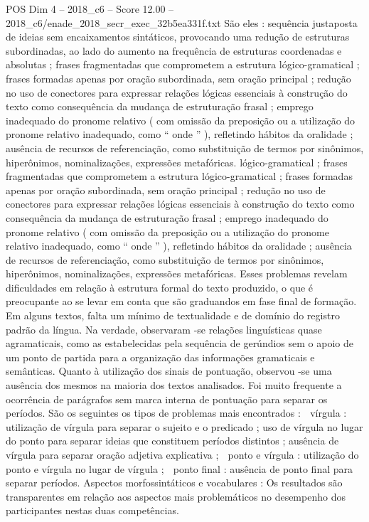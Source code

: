\begin{textsample}{POS Dim 4 – 2018\_c6 – Score 12.00 – 2018\_c6/enade\_2018\_secr\_exec\_32b5ea331f.txt}
São eles : sequência justaposta de ideias sem encaixamentos sintáticos, provocando uma redução de estruturas subordinadas, ao lado do aumento na frequência de estruturas coordenadas e absolutas ; frases fragmentadas que comprometem a estrutura lógico-gramatical ; frases formadas apenas por oração subordinada, sem oração principal ; redução no uso de conectores para expressar relações lógicas essenciais à construção do texto como consequência da mudança de estruturação frasal ; emprego inadequado do pronome relativo ( com omissão da preposição ou a utilização do pronome relativo inadequado, como “ onde ” ), refletindo hábitos da oralidade ; ausência de recursos de referenciação, como substituição de termos por sinônimos, hiperônimos, nominalizações, expressões metafóricas. lógico-gramatical ; frases fragmentadas que comprometem a estrutura lógico-gramatical ; frases formadas apenas por oração subordinada, sem oração principal ; redução no uso de conectores para expressar relações lógicas essenciais à construção do texto como consequência da mudança de estruturação frasal ; emprego inadequado do pronome relativo ( com omissão da preposição ou a utilização do pronome relativo inadequado, como “ onde ” ), refletindo hábitos da oralidade ; ausência de recursos de referenciação, como substituição de termos por sinônimos, hiperônimos, nominalizações, expressões metafóricas.
Esses problemas revelam dificuldades em relação à estrutura formal do texto produzido, o que é preocupante ao se levar em conta que são graduandos em fase final de formação.
Em alguns textos, falta um mínimo de textualidade e de domínio do registro padrão da língua.
Na verdade, observaram -se relações linguísticas quase agramaticais, como as estabelecidas pela sequência de gerúndios sem o apoio de um ponto de partida para a organização das informações gramaticais e semânticas.
Quanto à utilização dos sinais de pontuação, observou -se uma ausência dos mesmos na maioria dos textos analisados.
Foi muito frequente a ocorrência de parágrafos sem marca interna de pontuação para separar os períodos.
São os seguintes os tipos de problemas mais encontrados :  vírgula : utilização de vírgula para separar o sujeito e o predicado ; uso de vírgula no lugar do ponto para separar ideias que constituem períodos distintos ; ausência de vírgula para separar oração adjetiva explicativa ;  ponto e vírgula : utilização do ponto e vírgula no lugar de vírgula ;  ponto final : ausência de ponto final para separar períodos.
Aspectos morfossintáticos e vocabulares : Os resultados são transparentes em relação aos aspectos mais problemáticos no desempenho dos participantes nestas duas competências.

\end{textsample}
